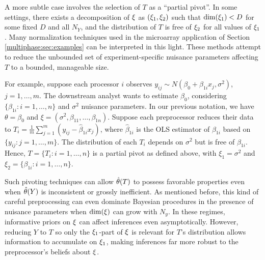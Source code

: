 A more subtle case involves the selection of $T$ as a ``partial pivot''.
In some settings, there exists a decomposition of $\xi$ as $(\xi_1, \xi_2)$ such that $\dim(\xi_1) < D$ for some fixed $D$ and all $N_Y$, and the distribution of $T$ is free of  $\xi_2$ for all values of $\xi_1$.
Many normalization techniques used in the microarray application of Section \ref{multiphase:sec:examples} can be interpreted in this light.
These methods attempt to reduce the unbounded set of experiment-specific nuisance parameters affecting $T$ to a bounded, manageable size.

For example, suppose each processor $i$ observes $y_{ij} \sim N(\beta_0 + \beta_{1i} x_j, \sigma^2)$, $j=1 ,\ldots ,m$.
The downstream analyst wants to estimate $\beta_0$, considering $\{\beta_{1i} : i=1 ,\ldots ,n\}$ and $\sigma^2$ nuisance parameters.
In our previous notation, we have $\theta = \beta_0$ and $\xi = \left( \sigma^2, \beta_{11}, \ldots, \beta_{1n} \right)$.
Suppose each preprocessor reduces their data to $T_i = \frac{1}{m} \sum_{j=1}^{m} (y_{ij} - \hat{\beta}_{1i} x_j)$, where $\hat{\beta}_{1i}$ is the OLS estimator of $\beta_{1i}$ based on $\{y_{ij} : j=1 ,\ldots ,m\}$.
The distribution of each $T_i$ depends on $\sigma^2$ but is free of $\beta_{1i}$.
Hence, $T = \{T_i : i=1, \ldots ,n\}$ is a partial pivot as defined above, with $\xi_1 = \sigma^2$ and $\xi_2 = \{\beta_{1i} : i=1, \ldots, n\}$.

Such pivoting techniques can allow $\hat{\theta}(T)$ to possess favorable properties even when $\hat{\theta}(Y)$ is inconsistent or grossly inefficient.
As mentioned before, this kind of careful preprocessing can even dominate Bayesian procedures in the presence of nuisance parameters when $\dim(\xi)$ can grow with $N_y$.
In these regimes, informative priors on $\xi$ can affect inferences even asymptotically.
However, reducing $Y$ to $T$ so only the $\xi_{1}$-part of $\xi$ is relevant for $T$'s distribution allows information to accumulate on $\xi_1$, making inferences far more robust to the preprocessor's beliefs about $\xi$.


